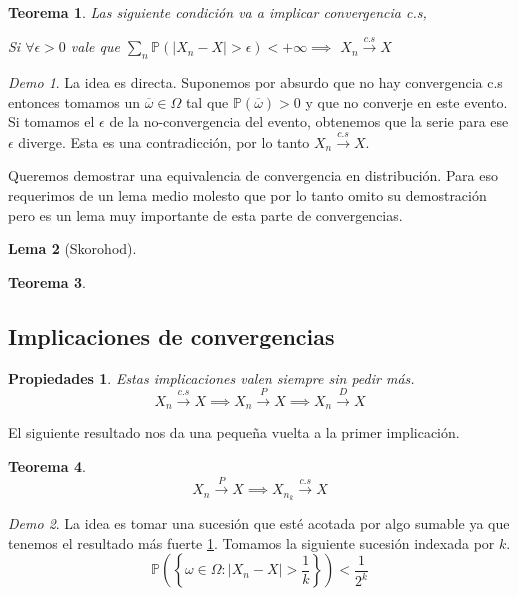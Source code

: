 \documentclass[11pt]{article}
\theoremstyle{plain} %
\newtheorem{teorema}{Teorema}
\newtheorem{lema}[teorema]{Lema}
\newtheorem*{props}{Propiedades}
\theoremstyle{definition}
\theoremstyle{remark}
\newtheorem*{demo}{Demo}
\def\Om{\Omega}
\def\P{\mathbb{P}}
\renewcommand\qed{\ding{110}}
\newcommand{\cs}{\overset{c.s}{\to}}
\newcommand{\proba}{\overset{P}{\to}}
\newcommand{\dist}{\overset{D}{\to}}
\begin{document}
\begin{teorema}
	\label{teo:seriecs}
	Las siguiente condición va a implicar convergencia c.s,
	
		 Si $\forall \epsilon > 0$ vale que $\sum_{n} \P(|X_n - X|>\epsilon) < + \infty \implies$
		 $X_n \cs X$
\end{teorema}

\begin{demo}
	La idea es directa. Suponemos por absurdo que no hay convergencia c.s entonces tomamos un $\overline{\omega} \in \Om$ tal que $\P(\overline{\omega}) > 0$ y que no converje en este evento. Si tomamos el $\epsilon$ de la no-convergencia del evento, obtenemos que la serie para ese $\epsilon$ diverge. Esta es una contradicción, por lo tanto $X_n \cs X$.
	\qed
\end{demo}

Queremos demostrar una equivalencia de convergencia en distribución. Para eso requerimos de un lema medio molesto que por lo tanto omito su demostración pero es un lema muy importante de esta parte de convergencias.

\begin{lema}
	[Skorohod]
\end{lema}

 
\begin{teorema}
	
\end{teorema}

\subsection{Implicaciones de convergencias}

\begin{props}
	Estas implicaciones valen siempre sin pedir más. \[ X_n \cs X \implies X_n \proba X \implies X_n \dist X \]
\end{props}

El siguiente resultado nos da una pequeña vuelta a la primer implicación.

\begin{teorema}
	\[ X_n \proba X \implies X_{n_{k}} \cs X  \]
\end{teorema}

\begin{demo}
	La idea es tomar una sucesión que esté acotada por algo sumable ya que tenemos el resultado más fuerte \ref{teo:seriecs}. Tomamos la siguiente sucesión indexada por $k$.
	\[ \P  \left( \left\lbrace \omega \in \Om : |X_n - X| > \frac{1}{k} \right\rbrace \right) < \frac{1}{2^k}  \]	\qed
\end{demo}
\end{document}
